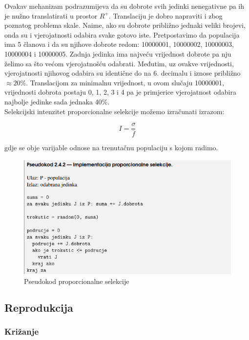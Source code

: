 \documentclass[times, utf8, zavrsni]{fer}
\begin{document}
	Ovakav mehanizam podrazumijeva da su dobrote svih jedinki nenegativne pa ih je nužno translatirati u prostor $R^+$. Translaciju je dobro napraviti i zbog poznatog problema skale. Naime, ako su dobrote približno jednaki veliki brojevi, onda su i vjerojatnosti odabira svake gotovo iste. Pretpostavimo da populacija ima 5 članova i da su njihove dobrote redom: 10000001, 10000002, 10000003, 10000004 i 10000005. Zadnja jedinka ima najveću vrijednost dobrote pa nju želimo sa što većom vjerojatnošću odabrati. Međutim, uz ovakve vrijednosti, vjerojatnosti njihovog odabira su identične do na 6. decimalu i iznose približno $\approx20\%$.  Translacijom za minimalnu vrijednost, u ovom slučaju 10000001, vrijednosti dobrota postaju 0, 1, 2, 3 i 4 pa je primjerice vjerojatnost odabira najbolje jedinke sada jednaka 40\%. \\
	Selekcijski intenzitet proporcionalne selekcije možemo izračunati izrazom:
	
	\begin{equation}
		I=\frac{\sigma}{\bar{f}}
	\end{equation}
	
	gdje se obje varijable odnose na trenutačnu populaciju s kojom radimo.
	
	\begin{figure}[!htb]
		\centering
		\includegraphics[width=15cm]{slike/proportionalSel.png}
		\caption{Pseudokod proporcionalne selekcije}
		\label{fig:proportional-selection}
	\end{figure}
	
	
	\subsection{Reprodukcija}
	
	\subsubsection{Križanje}
	
\end{document}
